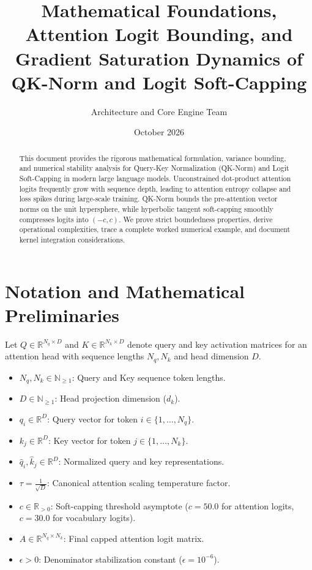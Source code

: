 \documentclass[11pt,a4paper]{article}
\title{\textbf{Mathematical Foundations, Attention Logit Bounding, and Gradient Saturation Dynamics of QK-Norm and Logit Soft-Capping}}
\author{Architecture and Core Engine Team}
\date{October 2026}
\theoremstyle{definition}
\begin{document}
\maketitle

\begin{abstract}
This document provides the rigorous mathematical formulation, variance bounding, and numerical stability analysis for Query-Key Normalization (QK-Norm) and Logit Soft-Capping in modern large language models. Unconstrained dot-product attention logits frequently grow with sequence depth, leading to attention entropy collapse and loss spikes during large-scale training. QK-Norm bounds the pre-attention vector norms on the unit hypersphere, while hyperbolic tangent soft-capping smoothly compresses logits into $(-c, c)$. We prove strict boundedness properties, derive operational complexities, trace a complete worked numerical example, and document kernel integration considerations.
\end{abstract}

\section{Notation and Mathematical Preliminaries}

Let $Q \in \mathbb{R}^{N_q \times D}$ and $K \in \mathbb{R}^{N_k \times D}$ denote query and key activation matrices for an attention head with sequence lengths $N_q, N_k$ and head dimension $D$.

\begin{itemize}
    \item $N_q, N_k \in \mathbb{N}_{\ge 1}$: Query and Key sequence token lengths.
    \item $D \in \mathbb{N}_{\ge 1}$: Head projection dimension ($d_k$).
    \item $q_i \in \mathbb{R}^D$: Query vector for token $i \in \{1, \dots, N_q\}$.
    \item $k_j \in \mathbb{R}^D$: Key vector for token $j \in \{1, \dots, N_k\}$.
    \item $\hat{q}_i, \hat{k}_j \in \mathbb{R}^D$: Normalized query and key representations.
    \item $\tau = \frac{1}{\sqrt{D}}$: Canonical attention scaling temperature factor.
    \item $c \in \mathbb{R}_{> 0}$: Soft-capping threshold asymptote ($c = 50.0$ for attention logits, $c = 30.0$ for vocabulary logits).
    \item $A \in \mathbb{R}^{N_q \times N_k}$: Final capped attention logit matrix.
    \item $\epsilon > 0$: Denominator stabilization constant ($\epsilon = 10^{-6}$).
\end{itemize}
\end{document}
